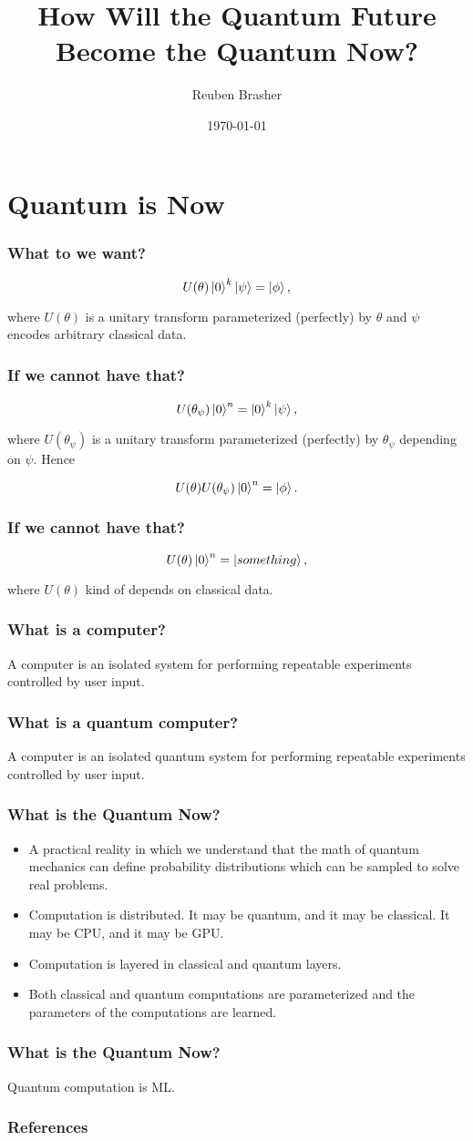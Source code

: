 \documentclass{beamer}
\title{How Will the Quantum Future Become the Quantum Now?}
\author{Reuben Brasher}
\date{\today}
\begin{document}
\frame{\titlepage}

\section[Outline]{}
\frame{\tableofcontents}

\section{Quantum is Now}

\frame
{
   \frametitle{What to we want?}

   $$U(\theta) \ket{0}^k \ket{\psi} = \ket{\phi},$$

   where $U(\theta)$ is a unitary transform parameterized (perfectly) by $\theta$ and $\psi$ encodes arbitrary classical
   data.
}

\frame
{
   \frametitle{If we cannot have that?}

   $$U(\theta_\psi) \ket{0}^n = \ket{0}^k \ket{\psi},$$

   where $U(\theta_\psi)$ is a unitary transform parameterized (perfectly) by $\theta_\psi$ depending on $\psi$. Hence

   $$U(\theta) U(\theta_\psi) \ket{0}^n = \ket{\phi}.$$
}

\frame
{
   \frametitle{If we cannot have that?}

   $$U(\theta) \ket{0}^n = \ket{something},$$

   where $U(\theta)$ kind of depends on classical data.
}

\frame
{
   \frametitle{What is a computer?}

   A computer is an isolated system for performing repeatable experiments controlled by user input.
}

\frame
{
   \frametitle{What is a quantum computer?}

   A computer is an isolated quantum system for performing repeatable experiments controlled by user input.
}

\frame
{
   \frametitle{What is the Quantum Now?}

   \begin{itemize}
      \item<1-> A practical reality in which we understand that the math of quantum mechanics can define probability
   distributions which can be sampled to solve real problems.

      \item<2-> Computation is distributed. It may be quantum, and it may be classical. It may be CPU, and it may be
   GPU.

      \item<3-> Computation is layered in classical and quantum layers.

      \item<4-> Both classical and quantum computations are parameterized and the parameters of
   the computations are learned.

   \end{itemize}
}

\frame
{
   \frametitle{What is the Quantum Now?}

   Quantum computation is ML.
}

\begin{frame}[t,allowframebreaks]
\frametitle{References}
\printbibliography
\end{frame}
\end{document}
